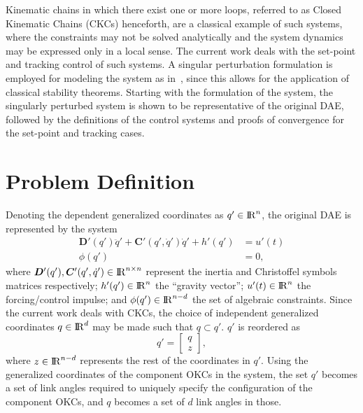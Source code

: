 \documentclass[10pt,final,journal,letterpaper,oneside,twocolumn]{IEEEtran}
\newcommand{\Real}{{\rm I\!R}}
\begin{document}
Kinematic chains in which there exist one or more loops, referred to
as Closed Kinematic Chains (CKCs) henceforth, are a classical example
of such systems, where the constraints may not be solved analytically
and the system dynamics may be expressed only in a local sense. The
current work deals with the set-point and tracking control of such
systems. A singular perturbation formulation is employed for modeling
the system as in~\cite{dabney_modeling_2002}, since this allows for
the application of classical stability theorems. Starting with the
formulation of the system, the singularly perturbed system is shown to
be representative of the original DAE, followed by the definitions of
the control systems and proofs of convergence for the set-point and
tracking cases.

\section{Problem Definition}
\label{sec:problem-definition}

Denoting the dependent generalized coordinates as $q'\in \Real^n$, the
original DAE is represented by the system
\begin{align}
  \bm{D}'(q')\ddot{q}' + \bm{C'}(q', \dot{q}')\dot{q}' + h'(q') &=
                                                         u'(t)\nonumber\\
  \phi(q') &= 0,
  \label{eq:DAE}
\end{align}
where $\bm{D}'(q'), \bm{C}'(q', \dot{q}') \in \Real^{n\times n}$
represent the inertia and Christoffel symbols matrices respectively;
$h'(q') \in \Real^n$ the ``gravity vector''; $u'(t) \in \Real^n$ the
forcing/control impulse; and $\phi(q') \in \Real^{n-d}$ the set of
algebraic constraints. Since the current work deals with CKCs, the
choice of independent generalized coordinates $q\in \Real^d$ may be
made such that $q\subset q'$. $q'$ is reordered as
\begin{equation}
  q' = \begin{bmatrix} q\\ z \end{bmatrix},
  \label{eq:qreord}
\end{equation}
where $z\in \Real^{n-d}$ represents the rest of the coordinates in
$q'$. Using the generalized coordinates of the component OKCs in the
system, the set $q'$ becomes a set of link angles required to uniquely
specify the configuration of the component OKCs, and $q$ becomes a set
of $d$ link angles in those.
\end{document}
